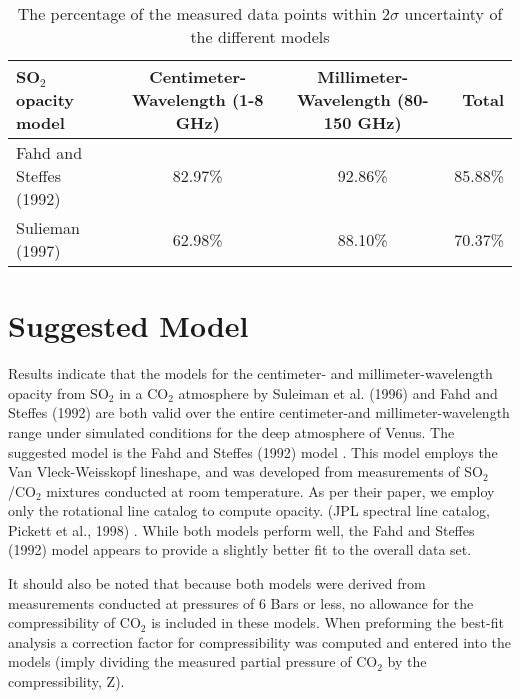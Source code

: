 \begin{sidewaystable}[p]

\caption{The percentage of the measured data points within $2\sigma$ uncertainty of the different models}
  \begin{tabular}{l | c c | r}
  \hline
  \hline
  SO$_2$ opacity model & Centimeter-Wavelength (1-8 GHz) & Millimeter-Wavelength (80-150 GHz) &Total\\
  \hline
  Fahd and Steffes (1992)	 & 82.97\%	& 	92.86\%& 85.88\%\\
  Sulieman (1997)& 62.98\%	&	88.10\%&70.37\%\\
  \hline
  \hline
  \end{tabular}
  \label{tab:model-comp}
\end{sidewaystable} 

\section{Suggested Model}
Results indicate that the models for the centimeter- and millimeter-wavelength opacity from SO$_2$ in a CO$_2$ atmosphere by Suleiman et al. (1996) and Fahd and Steffes (1992) are both valid over the entire centimeter-and millimeter-wavelength range under simulated conditions for the deep atmosphere of Venus. The suggested model is the Fahd and Steffes (1992) \cite{Fahd-thesis} model . This model employs the Van Vleck-Weisskopf lineshape, and was developed from measurements of SO$_2$/CO$_2$ mixtures conducted at room temperature. As per their paper, we employ only the rotational line catalog to compute opacity. (JPL spectral line catalog, Pickett et al., 1998) \cite{Pickett-1998}. While both models perform well, the Fahd and Steffes (1992) model appears to provide a slightly better fit to the overall data set. 

It should also be noted that because both models were derived from measurements conducted at pressures of 6 Bars or less, no allowance for the compressibility of CO$_2$ is included in these models. When preforming the best-fit analysis a correction factor for compressibility was computed and entered into the models (imply dividing the measured partial pressure of CO$_2$ by the compressibility, Z). 

